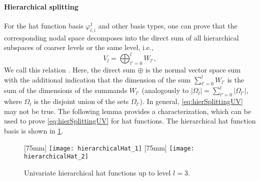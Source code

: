 \paragraph{Hierarchical splitting}

%
For the hat function basis $\varphi_{l,i}^1$ and other basis types,
one can prove that the corresponding nodal space
decomposes into the direct sum of all
hierarchical subspaces of coarser levels or the same level, i.e.,
\begin{equation}
  \label{eq:hierSplittingUV}
  V_l
  = \bigoplus_{l'=0}^l W_{l'},
\end{equation}
We call this relation .
Here, the direct sum $\oplus$ is
the normal vector space sum with the additional indication
that the dimension of the sum $\sum_{l'=0}^l W_{l'}$ is the sum
of the dimensions of the summands $W_{l'}$
(analogously to $|\Omega_l| = \sum_{l'=0}^l |\Omega_{l'}|$,
where $\Omega_l$ is the disjoint union of the sets $\Omega_{l'}$).
In general, \eqref{eq:hierSplittingUV} may not be true.
The following lemma provides a characterization,
which can be used to prove \eqref{eq:hierSplittingUV} for hat functions.
The hierarchical hat function basis is shown in \cref{fig:hierarchicalHat}.

\begin{figure}
  [75mm]{%
    \texttt{[image: hierarchicalHat\_1]}%
  }%
  \hfill%
  [75mm]{%
    \texttt{[image: hierarchicalHat\_2]}%
  }%
  \caption{Univariate hierarchical hat functions up to level $l = 3$.}
  \label{fig:hierarchicalHat}
\end{figure}

